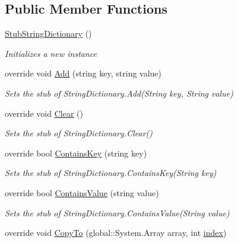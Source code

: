 \subsection*{Public Member Functions}
\begin{DoxyCompactItemize}
\item 
\hyperlink{class_system_1_1_collections_1_1_specialized_1_1_fakes_1_1_stub_string_dictionary_ae6f1f412b70fb499b0a6623dd4888c12}{Stub\-String\-Dictionary} ()
\begin{DoxyCompactList}\small\item\em Initializes a new instance\end{DoxyCompactList}\item 
override void \hyperlink{class_system_1_1_collections_1_1_specialized_1_1_fakes_1_1_stub_string_dictionary_a76ba3ba518f520d629b3b8bd836c0449}{Add} (string key, string value)
\begin{DoxyCompactList}\small\item\em Sets the stub of String\-Dictionary.\-Add(\-String key, String value)\end{DoxyCompactList}\item 
override void \hyperlink{class_system_1_1_collections_1_1_specialized_1_1_fakes_1_1_stub_string_dictionary_a986d6fb482c22ba97e66972ed1d46009}{Clear} ()
\begin{DoxyCompactList}\small\item\em Sets the stub of String\-Dictionary.\-Clear()\end{DoxyCompactList}\item 
override bool \hyperlink{class_system_1_1_collections_1_1_specialized_1_1_fakes_1_1_stub_string_dictionary_a1df8fa3a992bfda3e1872bb176d791f3}{Contains\-Key} (string key)
\begin{DoxyCompactList}\small\item\em Sets the stub of String\-Dictionary.\-Contains\-Key(\-String key)\end{DoxyCompactList}\item 
override bool \hyperlink{class_system_1_1_collections_1_1_specialized_1_1_fakes_1_1_stub_string_dictionary_a09333de3059c28e8e630b1ef8da3e2f4}{Contains\-Value} (string value)
\begin{DoxyCompactList}\small\item\em Sets the stub of String\-Dictionary.\-Contains\-Value(\-String value)\end{DoxyCompactList}\item 
override void \hyperlink{class_system_1_1_collections_1_1_specialized_1_1_fakes_1_1_stub_string_dictionary_ab5e9f07e8570c2bc826f60381d58bea8}{Copy\-To} (global\-::\-System.\-Array array, int \hyperlink{jquery-1_810_82-vsdoc_8js_a75bb12d1f23302a9eea93a6d89d0193e}{index})

\end{DoxyCompactItemize}
